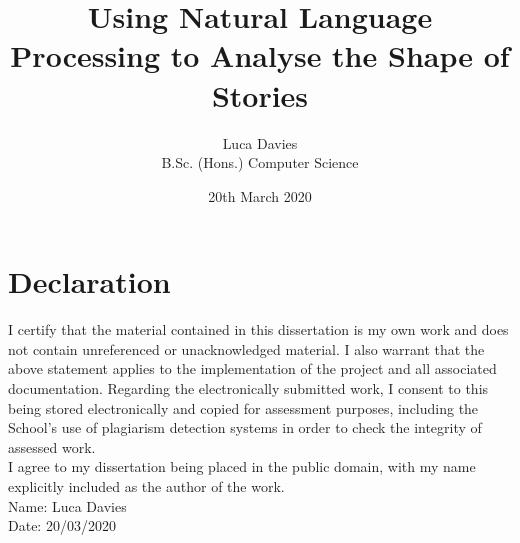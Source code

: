 \documentclass{article}
\title{\textbf{Using Natural Language Processing to Analyse the Shape of Stories}}
\author{
Luca Davies \\ B.Sc. (Hons.) Computer Science}
\date{20th March 2020}
\begin{document}
\maketitle

\newpage
\section*{Declaration}
    I certify that the material contained in this dissertation is my own work and does not contain unreferenced or unacknowledged material. I also warrant that the above statement applies to the implementation of the project and all associated documentation. Regarding the electronically submitted work, I consent to this being stored electronically and copied for assessment purposes, including the School’s use of plagiarism detection systems in order to check the integrity of assessed work. \\
    I agree to my dissertation being placed in the public domain, with my name explicitly included as the author of the work. \\
    
    \noindent
    Name: Luca Davies\\
    Date: 20/03/2020
\newpage
\end{document}
